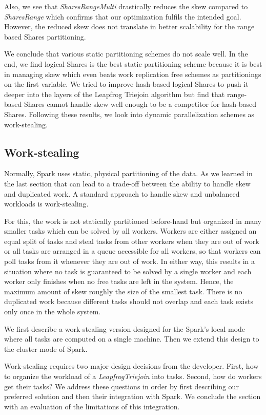 Also, we see that \textit{SharesRangeMulti} drastically reduces the skew compared to \textit{SharesRange} which confirms that our
optimization fulfils the intended goal.
However, the reduced skew does not translate in better scalability for the range based Shares partitioning.

We conclude that various static partitioning schemes do not scale well.
In the end, we find logical Shares is the best static partitioning scheme because it is best in managing skew which even beats work
replication free schemes as partitionings on the first variable.
We tried to improve hash-based logical Shares to push it deeper into the layers of the Leapfrog Triejoin algorithm but find that
range-based Shares cannot handle skew well enough to be a competitor for hash-based Shares.
Following these results, we look into dynamic parallelization schemes as work-stealing.

\subsection{Work-stealing} \label{subsec:work-stealing}
Normally, Spark uses static, physical partitioning of the data.
As we learned in the last section that can lead to a trade-off between the ability to handle skew and duplicated work.
A standard approach to handle skew and unbalanced workloads is work-stealing.

For this, the work is not statically partitioned before-hand but organized in many smaller tasks which can be
solved by all workers.
Workers are either assigned an equal split of tasks and steal tasks from other workers when they are out of work or all tasks are arranged
in a queue accessible for all workers, so that workers can poll tasks from it whenever they are out of work.
In either way, this results in a situation where no task is guaranteed to be solved by a single worker and each worker only finishes
when no free tasks are left in the system.
Hence, the maximum amount of skew roughly the size of the smallest task.
There is no duplicated work because different tasks should not overlap and each task exists only once in the whole system.

We first describe a work-stealing version designed for the Spark's local mode where all tasks are computed on a single machine.
Then we extend this design to the cluster mode of Spark.

Work-stealing requires two major design decisions from the developer.
First, how to organize the workload of a \textit{LeapfrogTriejoin} into tasks.
Second, how do workers get their tasks?
We address these questions in order by first describing our preferred solution and then their integration with Spark.
We conclude the section with an evaluation of the limitations of this integration.

